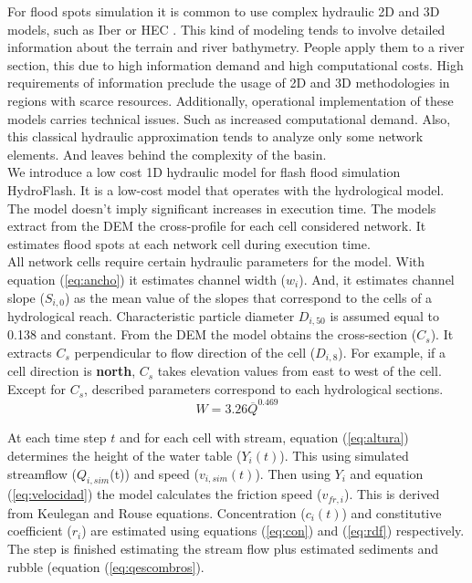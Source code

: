 {For flood spots simulation it is common to use complex hydraulic 2D and 3D models, such as Iber \citep{Cea2015} or HEC \citep{Gibson2010} .  This kind of modeling tends to involve detailed information about the terrain and river bathymetry.  People apply them to a river section, this due to high information demand and high computational costs.  High requirements of information preclude the usage of 2D and 3D methodologies in regions with scarce resources.  Additionally, operational implementation of these models carries technical issues. Such as increased computational demand. Also, this classical hydraulic approximation tends to analyze only some network elements. And leaves behind the complexity of the basin.\\

We introduce a low cost 1D hydraulic model for flash flood simulation HydroFlash.  It is a low-cost model that operates with the hydrological model. The model doesn't imply significant increases in execution time. The models extract from the DEM the cross-profile for each cell considered network.  It estimates flood spots at each network cell during execution time.\\

All network cells require certain hydraulic parameters for the model.  With equation (\ref{eq:ancho}) it estimates channel width ($w_i$).  And, it estimates channel slope ($S_{i,0}$) as the mean value of the slopes that correspond to the cells of a hydrological reach. Characteristic particle diameter $D_{i,50}$ is assumed equal to 0.138 and constant.  From the DEM the model obtains the cross-section ($C_s$). It extracts $C_s$ perpendicular to flow direction of the cell ($D_{i,8}$). For example, if a cell direction is \textbf{north}, $C_s$ takes elevation values from east to west of the cell. Except for $C_s$, described parameters correspond to each hydrological sections.\\

\begin{equation}
 W = 3.26 \overline{Q}^{0.469}
 \label{eq:ancho}
\end{equation}

At each time step $t$ and for each cell with stream, equation (\ref{eq:altura}) determines the height of the water table ($Y_{i}(t)$). This using simulated streamflow ($Q_{i,sim}$(t)) and speed ($v_{i,sim}(t)$). Then using $Y_i$ and equation (\ref{eq:velocidad}) the model calculates the friction speed ($v_{fr,i}$). This is derived from Keulegan and Rouse equations. Concentration ($c_{i}(t)$) and constitutive coefficient ($r_{i}$) are estimated using equations (\ref{eq:con}) and (\ref{eq:rdf}) respectively. The step is finished estimating the stream flow plus estimated sediments and rubble (equation (\ref{eq:qescombros}).\\

}
